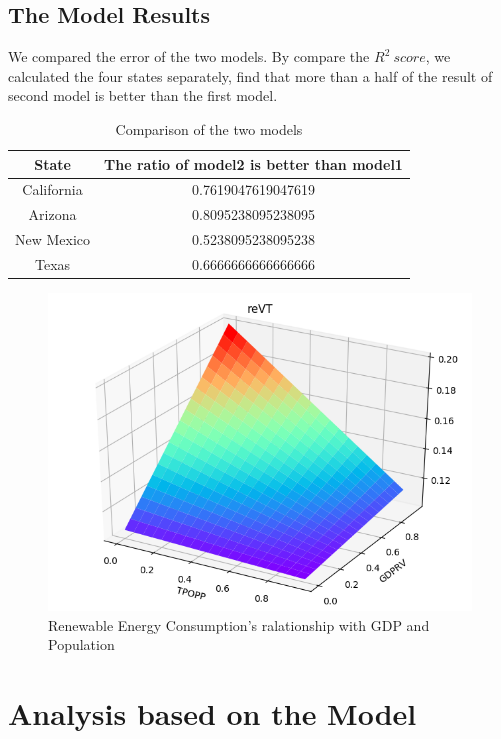 \documentclass{mcmthesis}
\begin{document}
\subsection{The Model Results}
We compared the error of the two models. By compare the $R^2\ score$, we calculated the four states separately,
find that more than a half of the result of second model is better than the first model.

\begin{table}[!htbp]
\centering
\caption{Comparison of the two models}\label{tab:aStrangeTable}
\begin{tabular}{cc}
\toprule
State& The ratio of model2 is better than model1\\
\midrule
California& 0.7619047619047619　\\
Arizona& 0.8095238095238095　\\
New Mexico& 0.5238095238095238 \\
Texas& 0.6666666666666666 \\
\bottomrule
\end{tabular}
\end{table}

\begin{figure} [h]
\small
\centering
\includegraphics[width=12cm]{CA_reVT.png}
\caption{Renewable Energy Consumption's ralationship with GDP and Population} \label{fig:aa}
\end{figure}

\section{Analysis based on the Model}
\end{document}
